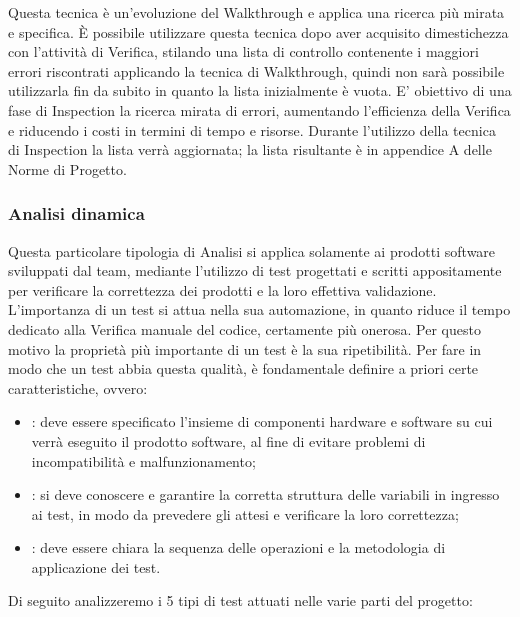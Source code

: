\label{3.1.2}
Questa tecnica è un'evoluzione del Walkthrough e applica una ricerca più mirata e specifica. È possibile utilizzare questa tecnica dopo aver acquisito dimestichezza con l'attività di Verifica, stilando una lista di controllo contenente i maggiori errori riscontrati applicando la tecnica di Walkthrough, quindi non sarà possibile utilizzarla fin da subito in quanto la lista inizialmente è vuota.
E' obiettivo di una fase di Inspection la ricerca mirata di errori, aumentando l'efficienza della Verifica e riducendo i costi in termini di tempo e risorse.
Durante l'utilizzo della tecnica di Inspection la lista verrà aggiornata; la lista risultante è in appendice A delle Norme di Progetto.

\subsubsection{Analisi dinamica}
\label{3.2}
Questa particolare tipologia di Analisi si applica solamente ai prodotti software sviluppati dal team, mediante l'utilizzo di test progettati e scritti appositamente per verificare la correttezza dei prodotti e la loro effettiva validazione.
L'importanza di un test si attua nella sua automazione, in quanto riduce il tempo dedicato alla Verifica manuale del codice, certamente più onerosa. Per questo motivo la proprietà più importante di un test è la sua ripetibilità.
Per fare in modo che un test abbia questa qualità, è fondamentale definire a priori certe caratteristiche, ovvero:
\begin{itemize}
\item {}: deve essere specificato l'insieme di componenti hardware e software su cui verrà eseguito il prodotto software, al fine di evitare problemi di incompatibilità e malfunzionamento;
\item {}: si deve conoscere e garantire la corretta struttura delle variabili in ingresso ai test, in modo da prevedere gli  attesi e verificare la loro correttezza;
\item {}: deve essere chiara la sequenza delle operazioni e la metodologia di applicazione dei test.
\end{itemize}
Di seguito analizzeremo i 5 tipi di test attuati nelle varie parti del progetto:

